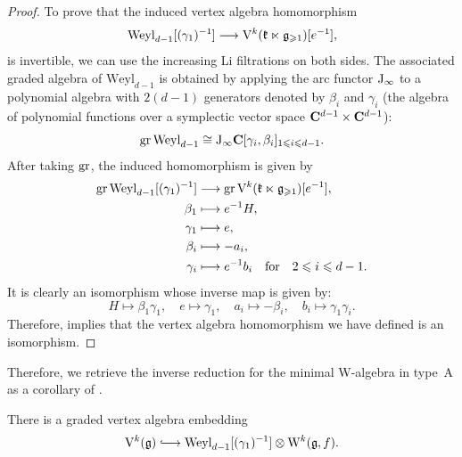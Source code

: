 \begin{proof}
	To prove that the induced vertex algebra homomorphism \[ \mathrm{Weyl}_{d-1}[(\gamma_1)^{-1}] \longrightarrow \mathrm V^k(\mathfrak k \ltimes \mathfrak g_{\geqslant 1})[e^{-1}], \]
	is invertible, we can use the increasing Li filtrations on both sides. The associated graded algebra of $\mathrm{Weyl}_{d-1}$ is obtained by applying the arc functor $\mathrm{J}_\infty$ to a polynomial algebra with $2 (d - 1)$ generators denoted by $\beta_i$ and $\gamma_i$ (the algebra of polynomial functions over a symplectic vector space $\mathbf{C}^{d - 1} \times \mathbf{C}^{d - 1}$):
	\[ \operatorname{gr} \mathrm{Weyl}_{d-1} \cong \mathrm{J}_\infty \mathbf{C}[\gamma_i, \beta_i]_{1 \leqslant i \leqslant d - 1}. \]
	After taking $\operatorname{gr}$, the induced homomorphism is given by
	\[ \begin{aligned}
		\operatorname{gr} \mathrm{Weyl}_{d-1}[(\gamma_1)^{-1}] & \longrightarrow  \operatorname{gr} \mathrm V^k(\mathfrak k \ltimes \mathfrak g_{\geqslant 1})[e^{-1}], \\
		\beta_1 & \longmapsto  e^{-1} H, \\
		\gamma_1 & \longmapsto e, \\
		\beta_i & \longmapsto - a_i, \\
		\gamma_i & \longmapsto e^{-1} b_i \quad \text{for} \quad 2 \leqslant i \leqslant d - 1.
	\end{aligned}  \] 
	It is clearly an isomorphism whose inverse map is given by:
	\[  H \longmapsto \beta_1 \gamma_1, \quad e \longmapsto \gamma_1, \quad a_i \longmapsto - \beta_i, \quad b_i \longmapsto \gamma_1 \gamma_i.  \]
	Therefore,  implies that the vertex algebra homomorphism we have defined is an isomorphism.
\end{proof}

Therefore, we retrieve the inverse reduction for the minimal W-algebra in type~A as a corollary of .

\begin{theorem}
	There is a graded vertex algebra embedding
	\[ \V^k(\g) \hooklongrightarrow \mathrm{Weyl}_{d-1}[(\gamma_1)^{-1}] \otimes \W^k(\g, f). \]
\end{theorem}



